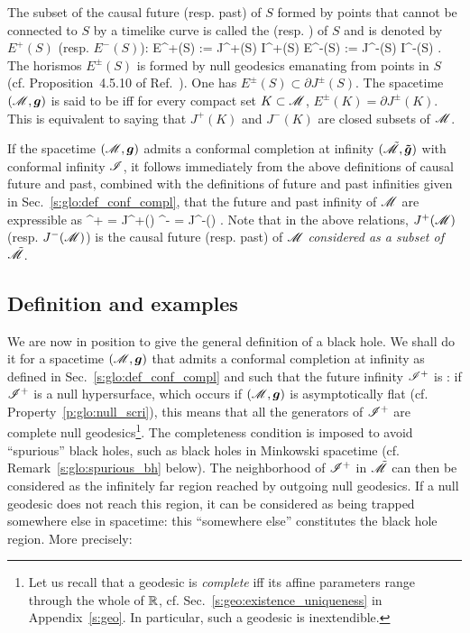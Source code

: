 The subset of the causal future (resp. past) of $S$ formed by points that cannot be connected
to $S$ by a timelike curve is called the 
(resp. )
of $S$ and is denoted by $E^+(S)$ (resp. $E^-(S)$):
\be
    E^+(S) :=  J^+(S) \setminus I^+(S) \qand
    E^-(S) :=  J^-(S) \setminus I^-(S) .
\ee
The horismos $E^\pm(S)$ is formed by null geodesics emanating from points in $S$
(cf. Proposition~4.5.10 of Ref.~\cite{HawkiE73}).
One has $E^\pm(S) \subset \partial J^\pm(S)$.
The spacetime $(\mathscr{M},\bm{g})$
is said to be 
iff for every compact set $K\subset \mathscr{M}$, $E^\pm(K) = \partial J^\pm(K)$. This is
equivalent to saying that $J^+(K)$ and $J^-(K)$ are closed subsets of $\mathscr{M}$.

If the spacetime $(\mathscr{M},\bm{g})$ admits a conformal completion at infinity $(\tilde{\mathscr{M}},\bm{\tilde{g}})$
with conformal infinity $\mathscr{I}$, it follows immediately from the above definitions
of causal future and past, combined with the definitions of future and past
infinities given in Sec.~\ref{s:glo:def_conf_compl}, that the future and past
infinity of $\mathscr{M}$ are expressible as
\be
    \scri^+ = \scri \cap J^+(\M) \qand
    \scri^- = \scri \cap J^-(\M) .
\ee
Note that in the above relations, $J^+(\mathscr{M})$ (resp. $J^-(\mathscr{M})$) is the causal future (resp. past)
of $\mathscr{M}$ \emph{considered as a subset of $\tilde{\mathscr{M}}$}.

\subsection{Definition and examples} \label{s:glo:def_BH}

We are now in position to give the general definition of a black hole.
We shall do it for a spacetime $(\mathscr{M},\bm{g})$ that admits a conformal completion
at infinity as defined in Sec.~\ref{s:glo:def_conf_compl} and
such that the future infinity $\mathscr{I}^+$ is
: if $\mathscr{I}^+$
is a null hypersurface, which occurs if $(\mathscr{M},\bm{g})$ is asymptotically flat
(cf. Property~\ref{p:glo:null_scri}),
this means that all the generators of $\mathscr{I}^+$ are complete null geodesics\footnote{Let us recall
that a geodesic is \emph{complete} iff its affine parameters range through the whole of
$\mathbb{R}$, cf. Sec.~\ref{s:geo:existence_uniqueness}
in Appendix~\ref{s:geo}. In particular, such a geodesic is inextendible.}.
The completeness condition is imposed to avoid ``spurious'' black holes,
such as black holes in Minkowski spacetime (cf. Remark~\ref{s:glo:spurious_bh} below).
The neighborhood of $\mathscr{I}^+$
in $\tilde{\mathscr{M}}$ can then be considered as the infinitely far region
reached by outgoing null geodesics. If a null geodesic does not reach this
region, it can be considered as being trapped somewhere else in spacetime: this
``somewhere else'' constitutes the black hole region. More precisely:

